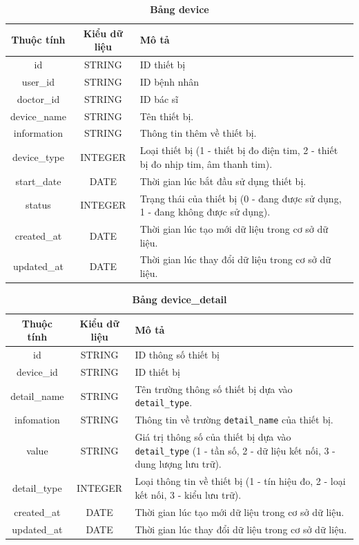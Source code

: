 \begin{table}[H]
  \caption{\bfseries \fontsize{12pt}{0pt}\selectfont Bảng device}
  \centering
  \begin{tabularx}{0.9\textwidth}{|c|c|X|}
    \hline
    \textbf{Thuộc tính} & \textbf{Kiểu dữ liệu} & \textbf{Mô tả} \\
    \hline
    id & STRING & ID thiết bị  \\
    \hline
    user\_id & STRING & ID bệnh nhân  \\
    \hline
    doctor\_id & STRING & ID bác sĩ  \\
    \hline
    device\_name & STRING & Tên thiết bị. \\
    \hline
    information & STRING & Thông tin thêm về thiết bị. \\
    \hline
    device\_type & INTEGER & Loại thiết bị (1 - thiết bị đo điện tim, 2 - thiết bị đo nhịp tim, âm thanh tim). \\
    \hline
    start\_date & DATE & Thời gian lúc bắt đầu sử dụng thiết bị. \\
    \hline
    status & INTEGER & Trạng thái của thiết bị (0 - đang được sử dụng, 1 - đang không được sử dụng). \\
    \hline
    created\_at & DATE & Thời gian lúc tạo mới dữ liệu trong cơ sở dữ liệu. \\
    \hline
    updated\_at & DATE & Thời gian lúc thay đổi dữ liệu trong cơ sở dữ liệu. \\
    \hline
  \end{tabularx}
\end{table}


\begin{table}[H]
  \caption{\bfseries \fontsize{12pt}{0pt}\selectfont Bảng device\_detail}
  \centering
  \begin{tabularx}{0.9\textwidth}{|c|c|X|}
    \hline
    \textbf{Thuộc tính} & \textbf{Kiểu dữ liệu} & \textbf{Mô tả} \\
    \hline
    id & STRING & ID thông số thiết bị  \\
    \hline
    device\_id & STRING & ID thiết bị  \\
    \hline
    detail\_name & STRING & Tên trường thông số thiết bị dựa vào \texttt{detail\_type}. \\
    \hline
    infomation & STRING & Thông tin về trường \texttt{detail\_name} của thiết bị. \\
    \hline
    value & STRING & Giá trị thông số của thiết bị dựa vào \texttt{detail\_type} (1 - tần số, 2 - dữ liệu kết nối, 3 - dung lượng lưu trữ). \\
    \hline
    detail\_type & INTEGER & Loại thông tin về thiết bị (1 - tín hiệu đo, 2 - loại kết nối, 3 - kiểu lưu trữ). \\
    \hline
    created\_at & DATE & Thời gian lúc tạo mới dữ liệu trong cơ sở dữ liệu. \\
    \hline
    updated\_at & DATE & Thời gian lúc thay đổi dữ liệu trong cơ sở dữ liệu. \\
    \hline
  \end{tabularx}
\end{table}

